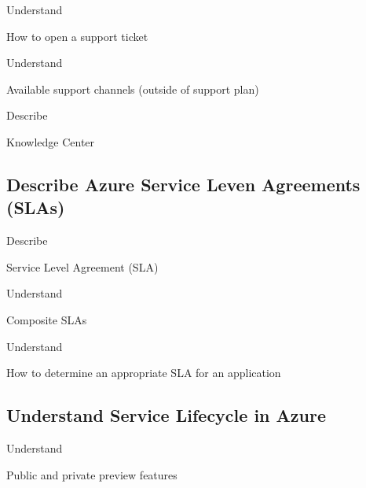 \documentclass{scrartcl}
\newenvironment{flashcard}[2][]{%
    #1
    \vfill
    \centerline{\Large{#2}}
    \vfill
    \newpage
}
{\newpage}
\newcommand{\subsectioncard}[1]{
    \vspace*{\stretch{1}}
    \subsection{#1}
    \vspace*{\stretch{1}}
    \pagebreak
}
\begin{document}
    \begin{flashcard}[Understand]{How to open a support ticket}

    \end{flashcard}

    \begin{flashcard}[Understand]{Available support channels (outside of support plan)}

    \end{flashcard}

    \begin{flashcard}[Describe]{Knowledge Center}

    \end{flashcard}

    \subsectioncard{Describe Azure Service Leven Agreements (SLAs)}

    \begin{flashcard}[Describe]{Service Level Agreement (SLA)}

    \end{flashcard}

    \begin{flashcard}[Understand]{Composite SLAs}

    \end{flashcard}

    \begin{flashcard}[Understand]{How to determine an appropriate SLA for an application}

    \end{flashcard}

    \subsectioncard{Understand Service Lifecycle in Azure}

    \begin{flashcard}[Understand]{Public and private preview features}

    \end{flashcard}
\end{document}
